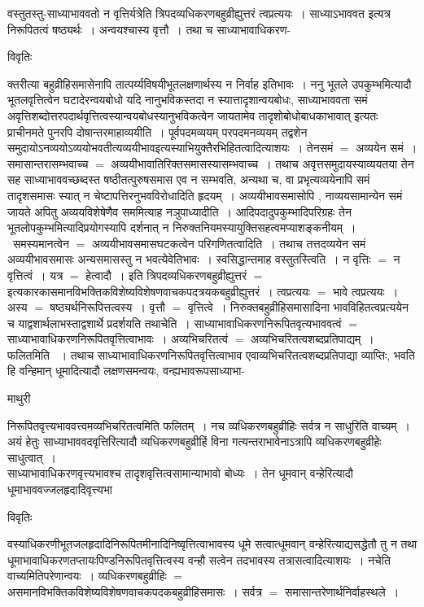\documentclass[10pt, openany]{book}
\begin{document}
{{\la वस्तुतस्तु}-साध्याभाववतो न वृत्तिर्यत्रेति त्रिपदव्यधिकरणबहुव्रीह्युत्तरं त्वप्रत्ययः~। साध्याऽभाववत इत्यत्र निरूपितत्वं षष्ठ्यर्थः~। अन्वयश्चास्य वृत्तौ~। तथा च साध्याभावाधिकरण-
\begin{center}     विवृतिः \end{center}
क्तरीत्या बहुव्रीहिसमासेनापि तात्पर्य्यविषयीभूतलक्षणार्थस्य न निर्वाह इतिभावः~। ननु भूतले उपकुम्भमित्यादौ भूतलवृत्तित्वेन घटादेरन्वयबोधो यदि नानुभविकस्तदा न स्यात्तादृशान्वयबोधः, साध्याभाववता समं अवृत्तिशब्दोत्तरपदार्थवृत्तित्वस्यान्वयबोधस्यानुभविकत्वेन जायतामेव तादृशोबोधोबाधकाभावात् इत्यतः प्राचीनमते पुनरपि दोषान्तरमाहाव्ययीति~। पूर्वपदमव्ययम् परपदमनव्ययम् तद्वशेन समुदायोऽनव्ययोऽव्ययोभवतीत्यव्ययीभावइत्यस्याभियुक्तैरभिहितत्वादित्याशयः~। तेनसमं $=$ अव्ययेन समं~। समासान्तरासम्भवाच्च $=$ अव्ययीभावातिरिक्तसमासस्यासम्भवाच्च~। तथाच अवृत्तसमुदायस्याव्ययतया तेन सह साध्याभाववच्छब्दस्त षष्ठीतत्पुरुषसमास एव न सम्भवति, अन्यथा च, वा प्रभृत्यव्ययेनापि समं तादृशसमासः स्यात् न चेष्टापत्तिरनुभवविरोधादिति हृदयम्~। अव्ययीभावसमासोपि , नाव्ययसामान्येन समं जायते अपितु अव्ययविशेषेणैव सममित्याह नञुपाध्यादीति~। आदिपदादुपकुम्भादिपरिग्रहः  तेन भूतलोपकुम्भमित्यादिप्रयोगस्यापि दर्शनात् न निरुक्तनियमस्यायुक्तिसहत्वमप्याशङ्कनीयम्~।~समस्यमानत्वेन $=$ अव्ययीभावसमासघटकत्वेन  {\la परिगणितत्वादिति~।} तथाच तत्तदव्ययेन समं अव्ययीभावसमासः अन्यसमासस्तु न भवत्येवेतिभावः~। स्वसिद्धान्तमाह {\la वस्तुतस्त्विति~।} न वृत्तिः $=$  न वृत्तित्वं~। यत्र $=$ हेत्वादौ~। इति त्रिपदव्यधिकरणबहुव्रीह्युत्तरं $=$ इत्यकारकासमानविभक्तिकविशेष्यविशेषणवाचकपदत्रयकबहुव्रीह्युत्तरं~। त्वप्रत्ययः $=$ भावे त्वप्रत्ययः~।\\

अस्य $=$ षष्ठ्यर्थनिरूपित्तत्वस्य~। वृत्तौ $=$ वृत्तित्वे~। निरुक्तबहुव्रीहिसमासादिना भावविहितत्वप्रत्ययेन च याद्वशार्थलाभस्ताद्वशार्थे  प्रदर्शयति तथाचेति~।
साध्याभावाधिकरणनिरूपितवृत्यभाववत्वं $=$ साध्याभावाधिकरणनिरूपितवृत्तित्वाभावः~। अव्यभिचरितत्वं $=$ अव्यभिचरितत्वशब्दप्रतिपाद्यम्~।  फलितमिति~ ।
तथाच साध्याभावाधिकरणनिरूपितवृत्तित्वाभाव एवाव्यभिचरितत्वशब्दप्रतिपाद्या व्याप्तिः, भवति हि वन्हिमान् धूमादित्यादौ लक्षणसमन्वयः, वन्ह्यभावरूपसाध्याभा-
\newpage
\begin{center}  माथुरी  \end{center}
{\la निरूपितवृत्त्यभाववत्त्वमव्यभिचरितत्वमिति फलितम्~। नच व्यधिकरणबहुव्रीहिः सर्वत्र न साधुरिति वाच्यम्~। अयं हेतुः साध्याभाववदवृत्तिरित्यादौ व्यधिकरणबहुव्रीहिं विना गत्यन्तराभावेनाऽत्रापि व्यधिकरणबहुव्रीहेः साधुत्वात्~।\\

साध्याभावाधिकरणवृत्त्यभावश्च तादृशवृत्तित्वसामान्याभावो बोध्यः~। तेन धूमवान् वन्हेरित्यादौ धूमाभाववज्जलहृदादिवृत्त्यभा}
\begin{center}     विवृतिः \end{center}
वस्याधिकरणीभूतजलहृदादिनिरूपितमीनादिनिष्वृत्तित्वाभावस्य धूमे सत्वात्धूमवान् वन्हेरित्याद्यसद्धेतौ तु न तथा धूमाभावाधिकरणतप्तायःपिण्डनिरूपितवृत्तित्वस्य वन्हौ सत्वेन तदभावस्य तत्रासत्वादित्याशयः~। नचेति वाच्यमितिपरेणान्वयः~। व्यधिकरणबहुव्रीहिः $=$ असमानविभक्तिकविशेष्यविशेषणवाचकपदकबहुव्रीहिसमासः~। सर्वत्र $=$ समासान्तरेणार्थनिर्वाहस्थले~।\\

}
\end{document}
